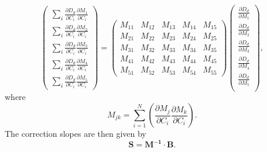 \begin{equation}
\left(\begin{array}{c}\sum_i\frac{\partial D_d}{\partial C_i}\frac{\partial M_1}{\partial C_i}\\\sum_i\frac{\partial D_d}{\partial C_i}\frac{\partial M_2}{\partial C_i}\\\sum_i\frac{\partial D_d}{\partial C_i}\frac{\partial M_3}{\partial C_i}\\\sum_i\frac{\partial D_d}{\partial C_i}\frac{\partial M_4}{\partial C_i}\\\sum_i\frac{\partial D_d}{\partial C_i}\frac{\partial M_5}{\partial C_i}\end{array}\right)=\left(\begin{array}{ccccc} M_{11} & M_{12} & M_{13} & M_{14} & M_{15}\\ M_{21} & M_{22} & M_{23} & M_{24} & M_{25}\\M_{31} & M_{32} & M_{33} & M_{34} & M_{35}\\M_{41} & M_{42} & M_{43} & M_{44} & M_{45}\\M_{51} & M_{52} & M_{53} & M_{54} & M_{55}\end{array}\right) \left(\begin{array}{c}\frac{\partial D_d}{\partial M_1}\\\frac{\partial D_d}{\partial M_2}\\\frac{\partial D_d}{\partial M_3}\\\frac{\partial D_d}{\partial M_4}\\\frac{\partial D_d}{\partial M_5}\\\end{array}\right),
\label{eq:chisquare_matrix}
\end{equation}
where 
\[
M_{jk}=\sum_{i=1}^N\left(\frac{\partial M_j}{\partial C_i}\frac{\partial M_k}{\partial C_i}\right).
\]
The correction slopes are then given by 
\begin{equation}
\mathbf{S=M^{-1}\cdot B}.
\label{eq:solution_to_matrix}
\end{equation}

